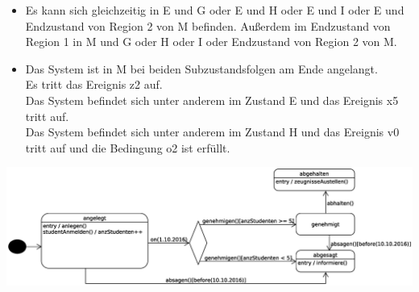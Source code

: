 \documentclass[a4paper, 12pt, margins=2.5cm]{homework}
\begin{document}
  \begin{problem}
    
  \end{problem}
  \begin{solution}\hfill
    \begin{itemize}
      \item Es kann sich gleichzeitig in E und G oder E und H oder E und I oder 
            E und Endzustand von Region 2 von M befinden.
            Außerdem im Endzustand von Region 1 in M und G oder H oder I oder 
            Endzustand von Region 2 von M.
      \item Das System ist in M bei beiden Subzustandsfolgen am Ende angelangt. \\
            Es tritt das Ereignis z2 auf. \\
            Das System befindet sich unter anderem im Zustand E und das Ereignis 
            x5 tritt auf. \\
            Das System befindet sich unter anderem im Zustand H und das Ereignis
            v0 tritt auf und die Bedingung o2 ist erfüllt.
    \end{itemize}
  \end{solution}


  \begin{problem}
    
  \end{problem}
  \begin{solution}\hfill
    \begin{center}
      \includegraphics[scale=0.4]{Aufgabe4.eps}
    \end{center}
    
  \end{solution}
\end{document}
